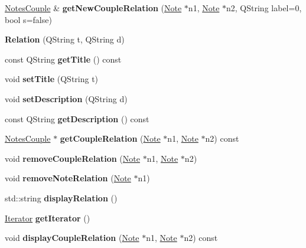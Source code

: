 \begin{DoxyCompactItemize}
\item 
\mbox{\label{class_relation_a69211cc18aed20c1df97c4b73317a2e1}} 
\hyperlink{class_notes_couple}{Notes\+Couple} \& {\bfseries get\+New\+Couple\+Relation} (\hyperlink{class_note}{Note} $\ast$n1, \hyperlink{class_note}{Note} $\ast$n2, Q\+String label=0, bool s=false)
\item 
\mbox{\label{class_relation_ac665710061b98c5e13acaf3d9c5f68f6}} 
{\bfseries Relation} (Q\+String t, Q\+String d)
\item 
\mbox{\label{class_relation_a9fa4906bc1024cce50cab4755c5bdecf}} 
const Q\+String {\bfseries get\+Title} () const
\item 
\mbox{\label{class_relation_a10e75a04dcb8f1a4661d1a316bc49f05}} 
void {\bfseries set\+Title} (Q\+String t)
\item 
\mbox{\label{class_relation_a5fd3dc676bd0e4994b5fa1897c3a3a93}} 
void {\bfseries set\+Description} (Q\+String d)
\item 
\mbox{\label{class_relation_a8bae20c027348b4e374c525f6ab1d840}} 
const Q\+String {\bfseries get\+Description} () const
\item 
\mbox{\label{class_relation_a086c39ecf396e3cfcb465fd9eea5a904}} 
\hyperlink{class_notes_couple}{Notes\+Couple} $\ast$ {\bfseries get\+Couple\+Relation} (\hyperlink{class_note}{Note} $\ast$n1, \hyperlink{class_note}{Note} $\ast$n2) const
\item 
\mbox{\label{class_relation_ab81e16d688dcb4703e8ab299fef80c10}} 
void {\bfseries remove\+Couple\+Relation} (\hyperlink{class_note}{Note} $\ast$n1, \hyperlink{class_note}{Note} $\ast$n2)
\item 
\mbox{\label{class_relation_a8f25fe0ab5bf722eb08d2dd31e99c7f4}} 
void {\bfseries remove\+Note\+Relation} (\hyperlink{class_note}{Note} $\ast$n1)
\item 
\mbox{\label{class_relation_a0b8a359787fe32c991710039fd081f97}} 
std\+::string {\bfseries display\+Relation} ()
\item 
\mbox{\label{class_relation_ae30f6b7351f9ff6b3ed74422738a6ea2}} 
\hyperlink{class_relation_1_1_iterator}{Iterator} {\bfseries get\+Iterator} ()
\item 
\mbox{\label{class_relation_aa6974a453611dee90f2ca2da9fe30de6}} 
void {\bfseries display\+Couple\+Relation} (\hyperlink{class_note}{Note} $\ast$n1, \hyperlink{class_note}{Note} $\ast$n2) const
\end{DoxyCompactItemize}


